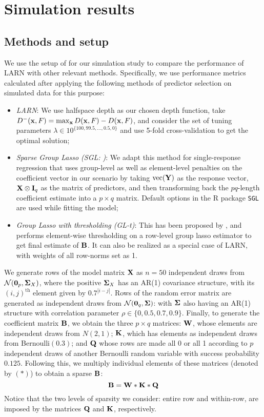 \section{Simulation results}
\label{sec:regression-sec5}

\subsection{Methods and setup}
We use the setup of \cite{RothmanEtal10} for our simulation study to compare the performance of LARN with other relevant methods. Specifically, we use performance metrics calculated after applying the following methods of predictor selection on simulated data for this purpose:

\begin{itemize}
\item \textit{LARN}: We use halfspace depth as our chosen depth function, take $D^-({\bf{x}},F) = \max_{\bf{x}} D({\bf{x}},F) - D({\bf{x}},F)$, and consider the set of tuning parameters $\lambda \in 10^{\{ 100, 99.5, ..., 0.5, 0 \}}$ and use 5-fold cross-validation to get the optimal solution;

\item \textit{Sparse Group Lasso (SGL: \cite{SimonEtal13})}: We adapt this method for single-response regression that uses group-level as well as element-level penalties on the coefficient vector in our scenario by taking $\operatorname*{\text{vec}}({\mathbf{Y}})$ as the response vector, ${\mathbf{X}} \otimes {\mathbf{I}}_q$ as the matrix of predictors, and then transforming back the $pq$-length coefficient estimate into a $p \times q$ matrix. Default options in the R package \texttt{SGL} are used while fitting the model;

\item \textit{Group Lasso with thresholding (GL-t)}: This has been proposed by \cite{ObozinskiEtal11}, and performs element-wise thresholding on a row-level group lasso estimator to get final estimate of ${\mathbf{B}}$. It can also be realized as a special case of LARN, with weights of all row-norms set as 1.
\end{itemize}

We generate rows of the model matrix ${\mathbf{X}}$ as $n=50$ independent draws from $\mathcal{N} ({\bf 0}_p, {\boldsymbol{\Sigma}}_X)$, where the positive ${\boldsymbol{\Sigma}}_X$ has an AR(1) covariance structure, with its $(i,j)^\text{th}$ element given by $0.7^{|i-j|}$. Rows of the random error matrix are generated as independent draws from $\mathcal{N} ({\bf 0}_q, {\boldsymbol{\Sigma}})$: with ${\boldsymbol{\Sigma}}$ also having an AR(1) structure with correlation parameter $\rho \in \{ 0, 0.5, 0.7, 0.9 \}$. Finally, to generate the coefficient matrix ${\mathbf{B}}$, we obtain the three $p \times q$ matrices: ${\mathbf{W}}$, whose elements are independent draws from $N(2,1)$; ${\mathbf{K}}$, which has elements as independent draws from Bernoulli$(0.3)$; and ${\mathbf{Q}}$ whose rows are made all 0 or all 1 according to $p$ independent draws of another Bernoulli random variable with success probability $0.125$. Following this, we multiply individual elements of these matrices (denoted by $(*)$) to obtain a sparse ${\mathbf{B}}$:
%
$$
{\mathbf{B}} = {\mathbf{W}} * {\mathbf{K}} * {\mathbf{Q}}
$$
%
Notice that the two levels of sparsity we consider: entire row and within-row, are imposed by the matrices ${\mathbf{Q}}$ and ${\mathbf{K}}$, respectively.

